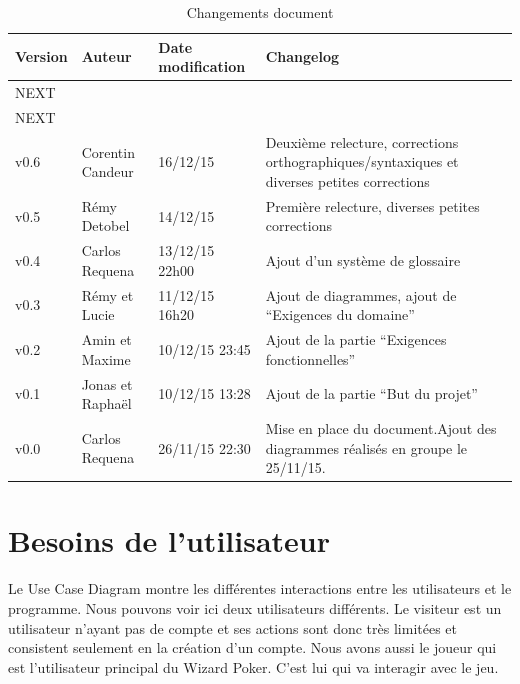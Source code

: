 \documentclass[11pt,a4paper]{article}
\begin{document}
\begin{table}[h]
  \centering
  \begin{tabular}[ht]{|l|l|l|p{18em}|}
    \hline

    \textbf{Version}
    & \textbf{Auteur}
    & \textbf{Date modification}
    & \textbf{Changelog}\\ \hline \hline
    NEXT &  &  &  \\ \hline
    NEXT &  &  &  \\ \hline
     v0.6 & Corentin Candeur & 16/12/15 & Deuxième relecture, corrections orthographiques/syntaxiques et diverses petites corrections \\ \hline
    v0.5 & Rémy Detobel & 14/12/15 & Première relecture, diverses petites corrections \\ \hline
    v0.4 & Carlos Requena  & 13/12/15 22h00 & Ajout d'un système de glossaire \\ \hline
    v0.3 & Rémy et Lucie  & 11/12/15 16h20 & Ajout de diagrammes, ajout de ``Exigences du domaine'' \\ \hline
    v0.2 & Amin et Maxime & 10/12/15 23:45 & Ajout de la partie ``Exigences fonctionnelles''\\ \hline
    v0.1 & Jonas et Raphaël & 10/12/15 13:28 & Ajout de la partie ``But du projet''\\ \hline
    v0.0 & Carlos Requena & 26/11/15 22:30 & Mise en place du document.Ajout des diagrammes réalisés en groupe le 25/11/15.\\ \hline
  \end{tabular}
  \caption{Changements document}
  \label{tab:hist}
\end{table}


\glsaddall
\printnoidxglossaries


\section{Besoins de l'utilisateur}
\label{sec:besoins}

Le Use Case Diagram montre les différentes interactions entre les
utilisateurs et le programme.  Nous pouvons voir ici deux utilisateurs
différents.  Le visiteur est un utilisateur n'ayant pas de compte et ses
actions sont donc très limitées et consistent seulement en la création d'un compte.
Nous avons aussi le joueur qui est l'utilisateur principal du Wizard Poker.
C'est lui qui va interagir avec le jeu.
\end{document}
